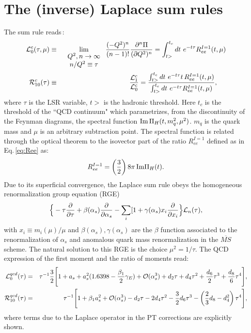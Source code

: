 \documentclass[review]{elsarticle}
\def\beq{\begin{equation}}
\def\eeq{\end{equation}}
\def\bea{\begin{eqnarray}}
\def\eea{\end{eqnarray}}
\def\nnb{\nonumber}
\def\ga{\left(}
\def\dr{\right)}
\def\nnb{\nonumber}
\begin{document}
\section{The (inverse) Laplace sum rules}
\vspace*{-0.20cm}
The sum rule reads\,\cite{SVZa,BELLa,BERTa,SNR}:
\bea
{\cal L}^c_0(\tau,\mu)&\equiv&\lim_ {\begin{tabular}{c}
$Q^2,n\to\infty$ \\ $n/Q^2\equiv\tau$
\end{tabular}}
\frac{(-Q^2)^n}{(n-1)!}\frac{\partial^n \Pi}{ ( \partial Q^2)^n}
=\int_{t>}^{t_c}dt~e^{-t\tau}  R_{ee}^{I=1}(t,\mu) %
\nnb\\
 {\cal R}^c_{10}(\tau)&\equiv&\frac{{\cal L}^c_{1}} {{\cal L}^c_0}= \frac{\int_{t>}^{t_c}dt~e^{-t\tau}t\, R_{ee}^{I=1}(t,\mu) }   {\int_{t>}^{t_c}dt~e^{-t\tau} R_{ee}^{I=1}(t,\mu) },~~~~
\label{eq:lsr}
\eea
where $\tau$ is the LSR variable, $t>$   is the hadronic threshold.  Here $t_c$ is  the threshold of the ``QCD continuum" which parametrizes, from the discontinuity of the Feynman diagrams, the spectral function  ${\rm Im}\,\Pi_H(t,m_q^2,\mu^2)$.  $m_q$ is the quark mass and $\mu$ is an arbitrary subtraction point. The spectral function is related  through the optical theorem to the isovector part of the ratio $R^{I=1}_{ee}$ defined as in Eq.\,\ref{eq:Ree} as:
\beq
R^{I=1}_{ee}=\ga\frac{3}{2}\dr 8\pi\, {\rm Im} \Pi_H(t).
\eeq
Due to its superficial convergence, the Laplace sum rule obeys the homogeneous renormalization group equation (RGE)\,\cite{SNR}
\beq
\Big{\{} -\tau\frac{\partial}{\partial\tau}+\beta(\alpha_s)\frac{\partial}{\partial\alpha_s} -\sum_i[1+\gamma(\alpha_s)x_i\frac{\partial}{\partial x_i}  \Big{\}}
{\cal{L}}_n(\tau),
\eeq
with $x_i\equiv m_i(\mu)/\mu$ and $\beta(\alpha_s), \gamma(\alpha_s)$ are the $\beta$ function associated to the renormalization of $\alpha_s$ and anomalous quark mass renormalization in the $\overline{MS}$ scheme. The natural solution to this RGE is the choice $\mu^2=1/\tau$. The QCD expression of the  first moment and the ratio of moments read:
\bea
{\cal L}^{qcd}_0(\tau)&=&\tau^{-1}\frac{3}{2}\Bigg{[}1+a_s+a_s^2( 1.6398-\frac{\beta_1}{2}\gamma_E)+{\cal O}(\alpha_s^3)+ d_2\tau+d_4\tau^2+\frac{d_6}{2}\tau^3+\frac{d_8}{6}\tau^4\Bigg{]},\nnb\\
{\cal R}^{qcd}_{10}(\tau)&=&\tau^{-1}\Bigg{[} 1+\beta_1 a_s^2+{\cal O}(\alpha_s^3)-d_2\tau-2d_4\tau^2-\frac{3}{2}d_6\tau^3-\ga\frac{2}{3}d_8-d_4^2\dr\tau^4\Bigg{]},
\eea
where terms due to the Laplace operator in the PT corrections are explicitly shown. 
\end{document}
